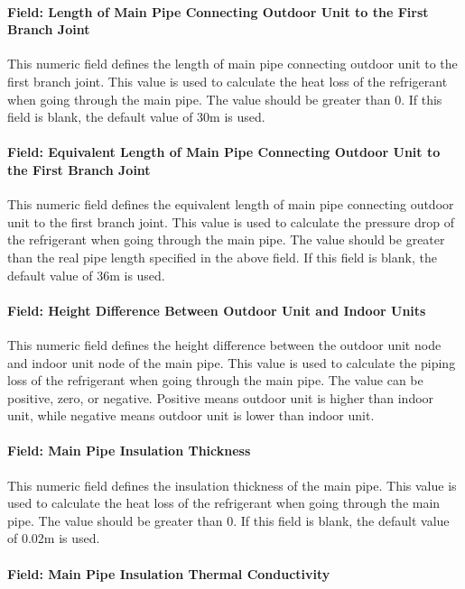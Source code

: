 \paragraph{Field: Length of Main Pipe Connecting Outdoor Unit to the First Branch Joint}

This numeric field defines the length of main pipe connecting outdoor unit to the first branch joint. This value is used to calculate the heat loss of the refrigerant when going through the main pipe. The value should be greater than 0. If this field is blank, the default value of 30m is used.

\paragraph{Field: Equivalent Length of Main Pipe Connecting Outdoor Unit to the First Branch Joint}

This numeric field defines the equivalent length of main pipe connecting outdoor unit to the first branch joint. This value is used to calculate the pressure drop of the refrigerant when going through the main pipe. The value should be greater than the real pipe length specified in the above field. If this field is blank, the default value of 36m is used.

\paragraph{Field: Height Difference Between Outdoor Unit and Indoor Units}

This numeric field defines the height difference between the outdoor unit node and indoor unit node of the main pipe. This value is used to calculate the piping loss of the refrigerant when going through the main pipe. The value can be positive, zero, or negative. Positive means outdoor unit is higher than indoor unit, while negative means outdoor unit is lower than indoor unit.

\paragraph{Field: Main Pipe Insulation Thickness}

This numeric field defines the insulation thickness of the main pipe. This value is used to calculate the heat loss of the refrigerant when going through the main pipe. The value should be greater than 0. If this field is blank, the default value of 0.02m is used.

\paragraph{Field: Main Pipe Insulation Thermal Conductivity}


